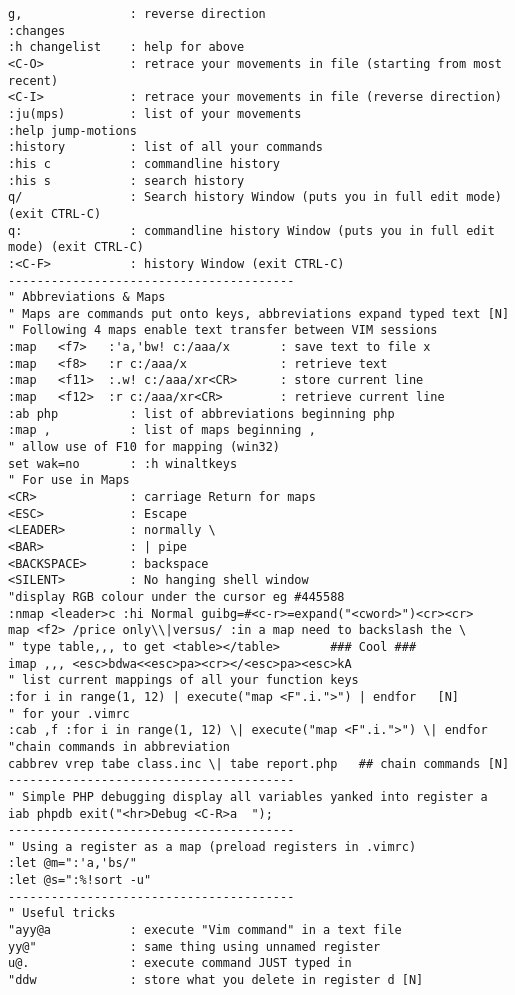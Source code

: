 \documentclass[10pt,landscape]{article}
\begin{document}
\begin{multicols}{2}
\begin{verbatim}
g,               : reverse direction 
:changes
:h changelist    : help for above
<C-O>            : retrace your movements in file (starting from most recent)
<C-I>            : retrace your movements in file (reverse direction)
:ju(mps)         : list of your movements
:help jump-motions
:history         : list of all your commands
:his c           : commandline history
:his s           : search history
q/               : Search history Window (puts you in full edit mode) (exit CTRL-C)
q:               : commandline history Window (puts you in full edit mode) (exit CTRL-C)
:<C-F>           : history Window (exit CTRL-C)
----------------------------------------
" Abbreviations & Maps
" Maps are commands put onto keys, abbreviations expand typed text [N]
" Following 4 maps enable text transfer between VIM sessions
:map   <f7>   :'a,'bw! c:/aaa/x       : save text to file x
:map   <f8>   :r c:/aaa/x             : retrieve text 
:map   <f11>  :.w! c:/aaa/xr<CR>      : store current line
:map   <f12>  :r c:/aaa/xr<CR>        : retrieve current line
:ab php          : list of abbreviations beginning php
:map ,           : list of maps beginning ,
" allow use of F10 for mapping (win32)
set wak=no       : :h winaltkeys
" For use in Maps
<CR>             : carriage Return for maps
<ESC>            : Escape
<LEADER>         : normally \
<BAR>            : | pipe
<BACKSPACE>      : backspace
<SILENT>         : No hanging shell window
"display RGB colour under the cursor eg #445588
:nmap <leader>c :hi Normal guibg=#<c-r>=expand("<cword>")<cr><cr>
map <f2> /price only\\|versus/ :in a map need to backslash the \
" type table,,, to get <table></table>       ### Cool ###
imap ,,, <esc>bdwa<<esc>pa><cr></<esc>pa><esc>kA
" list current mappings of all your function keys
:for i in range(1, 12) | execute("map <F".i.">") | endfor   [N]
" for your .vimrc
:cab ,f :for i in range(1, 12) \| execute("map <F".i.">") \| endfor
"chain commands in abbreviation
cabbrev vrep tabe class.inc \| tabe report.php   ## chain commands [N]
----------------------------------------
" Simple PHP debugging display all variables yanked into register a
iab phpdb exit("<hr>Debug <C-R>a  ");
----------------------------------------
" Using a register as a map (preload registers in .vimrc)
:let @m=":'a,'bs/"
:let @s=":%!sort -u"
----------------------------------------
" Useful tricks
"ayy@a           : execute "Vim command" in a text file
yy@"             : same thing using unnamed register
u@.              : execute command JUST typed in
"ddw             : store what you delete in register d [N]

\end{verbatim}
\end{multicols}
\end{document}
